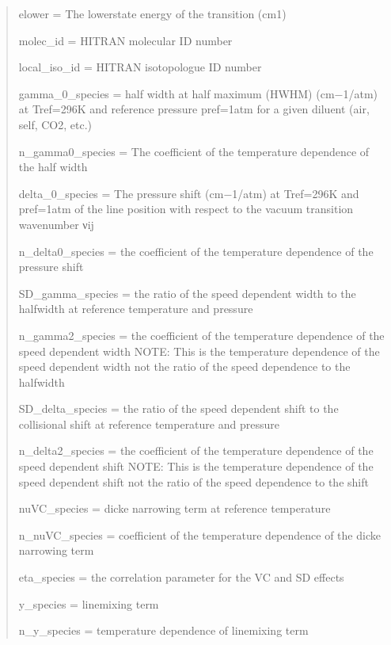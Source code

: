 \documentclass[letterpaper,10pt,english]{sphinxmanual}
\begin{document}
\begin{fulllineitems}
\begin{quote}
\begin{description}
\begin{itemize}
\begin{description}
\sphinxAtStartPar
elower = The lower\sphinxhyphen{}state energy of the transition (cm\sphinxhyphen{}1)

\sphinxAtStartPar
molec\_id = HITRAN molecular ID number

\sphinxAtStartPar
local\_iso\_id = HITRAN isotopologue ID number

\sphinxAtStartPar
gamma\_0\_species = half width at half maximum (HWHM) (cm−1/atm) at Tref=296K and reference pressure pref=1atm for a given diluent (air, self, CO2, etc.)

\sphinxAtStartPar
n\_gamma0\_species = The coefficient of the temperature dependence of the half width

\sphinxAtStartPar
delta\_0\_species = The pressure shift (cm−1/atm) at Tref=296K and pref=1atm of the line position with respect to the vacuum transition wavenumber νij

\sphinxAtStartPar
n\_delta0\_species = the coefficient of the temperature dependence of the pressure shift

\sphinxAtStartPar
SD\_gamma\_species = the ratio of the speed dependent width to the half\sphinxhyphen{}width at reference temperature and pressure

\sphinxAtStartPar
n\_gamma2\_species = the coefficient of the temperature dependence of the speed dependent width NOTE: This is the temperature dependence of the speed dependent width not the ratio of the speed dependence to the half\sphinxhyphen{}width

\sphinxAtStartPar
SD\_delta\_species = the ratio of the speed dependent shift to the collisional shift at reference temperature and pressure

\sphinxAtStartPar
n\_delta2\_species = the coefficient of the temperature dependence of the speed dependent shift NOTE: This is the temperature dependence of the speed dependent shift not the ratio of the speed dependence to the shift

\sphinxAtStartPar
nuVC\_species = dicke narrowing term at reference temperature

\sphinxAtStartPar
n\_nuVC\_species = coefficient of the temperature dependence of the dicke narrowing term

\sphinxAtStartPar
eta\_species = the correlation parameter for the VC and SD effects

\sphinxAtStartPar
y\_species = linemixing term

\sphinxAtStartPar
n\_y\_species = temperature dependence of linemixing term


\end{description}
\end{itemize}
\end{description}
\end{quote}
\end{fulllineitems}
\end{document}
